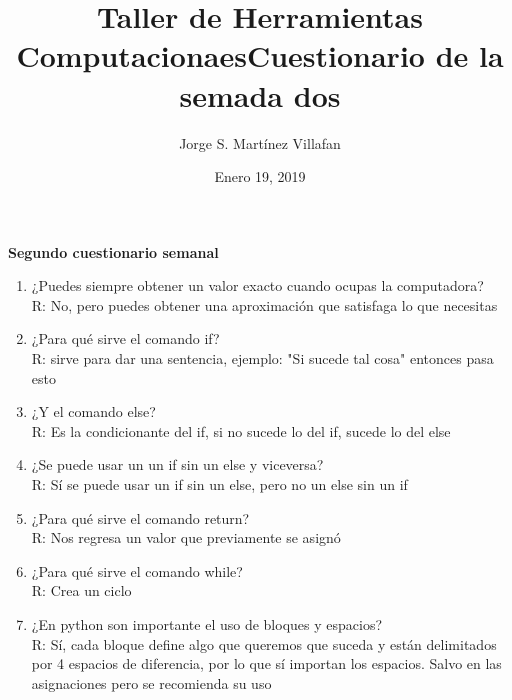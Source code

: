 \documentclass[letterpaper, 12pt, oneside]{article}%
\title{\Huge Taller de Herramientas Computacionaes}
\author{Jorge S. Martínez Villafan}
\date{Enero 19, 2019}
\begin{document}
\maketitle
\newpage
\title{Cuestionario de la semada dos}

\textbf{Segundo cuestionario semanal}
\begin{enumerate}
	\item ¿Puedes siempre obtener un valor exacto cuando ocupas la computadora?\\
R: No, pero puedes obtener una aproximación que satisfaga lo que necesitas
	\item ¿Para qué sirve el comando if?\\ R: sirve para dar una sentencia, ejemplo: "Si sucede tal cosa" entonces  pasa esto
	\item ¿Y el comando else?\\
R: Es la condicionante del if, si no sucede lo del if, sucede lo del else
	\item ¿Se puede usar un un if sin un else y viceversa?\\
R: Sí se puede usar un if sin un else, pero no un else sin un if
	\item ¿Para qué sirve el comando return?\\
R: Nos regresa un valor que previamente se asignó
	\item ¿Para qué sirve el comando while?\\
R: Crea un ciclo
	\item ¿En python son importante el uso de bloques y espacios?\\
R: Sí, cada bloque define algo que queremos que suceda y están delimitados por 4 espacios de diferencia, por lo que sí importan los espacios. Salvo en las asignaciones pero se recomienda su uso


\end{enumerate}
\end{document}
